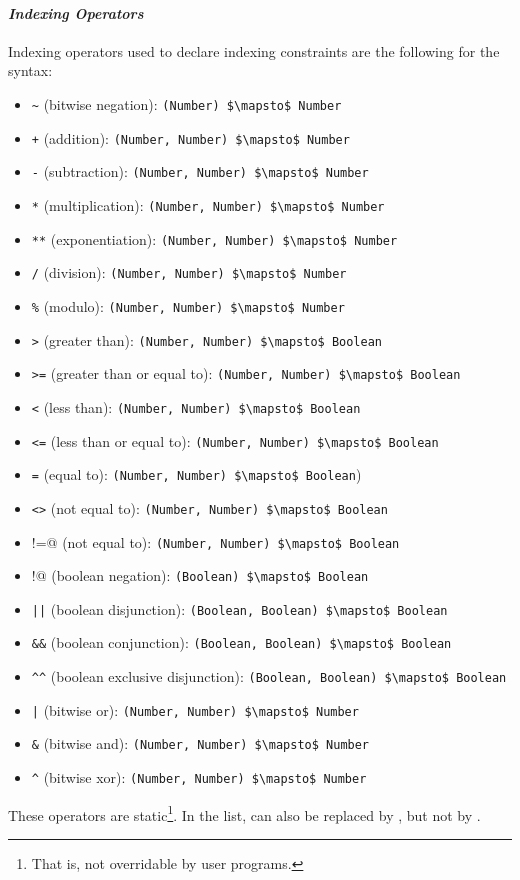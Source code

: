\paragraph{\em Indexing Operators}
Indexing operators used to declare indexing constraints are the following for the  syntax:
\begin{itemize}
\item \lstinline!~! (bitwise negation): \lstinline!(Number) $\mapsto$ Number!
\item \lstinline!+! (addition): \lstinline!(Number, Number) $\mapsto$ Number!
\item \lstinline!-! (subtraction): \lstinline!(Number, Number) $\mapsto$ Number!
\item \lstinline!*! (multiplication): \lstinline!(Number, Number) $\mapsto$ Number!
\item \lstinline!**! (exponentiation): \lstinline!(Number, Number) $\mapsto$ Number!
\item \lstinline!/! (division): \lstinline!(Number, Number) $\mapsto$ Number!
\item \lstinline!%! (modulo): \lstinline!(Number, Number) $\mapsto$ Number!
\item \lstinline!>! (greater than): \lstinline!(Number, Number) $\mapsto$ Boolean!
\item \lstinline!>=! (greater than or equal to): \lstinline!(Number, Number) $\mapsto$ Boolean!
\item \lstinline!<! (less than): \lstinline!(Number, Number) $\mapsto$ Boolean!
\item \lstinline!<=! (less than or equal to): \lstinline!(Number, Number) $\mapsto$ Boolean!
\item \lstinline!=! (equal to): \lstinline!(Number, Number) $\mapsto$ Boolean!)
\item \lstinline!<>! (not equal to): \lstinline!(Number, Number) $\mapsto$ Boolean!
\item \lstinline@!=@ (not equal to): \lstinline!(Number, Number) $\mapsto$ Boolean!
\item \lstinline@!@ (boolean negation): \lstinline!(Boolean) $\mapsto$ Boolean!
\item \lstinline!||! (boolean disjunction): \lstinline!(Boolean, Boolean) $\mapsto$ Boolean!
\item \lstinline!&&! (boolean conjunction): \lstinline!(Boolean, Boolean) $\mapsto$ Boolean!
\item \lstinline!^^! (boolean exclusive disjunction): \lstinline!(Boolean, Boolean) $\mapsto$ Boolean!
\item \lstinline!|! (bitwise or): \lstinline!(Number, Number) $\mapsto$ Number!
\item \lstinline!&! (bitwise and): \lstinline!(Number, Number) $\mapsto$ Number!
\item \lstinline!^! (bitwise xor): \lstinline!(Number, Number) $\mapsto$ Number!
\end{itemize}
These operators are static\footnote{That is, not overridable by user programs.}. In the list,  can also be replaced by , but not by . 

